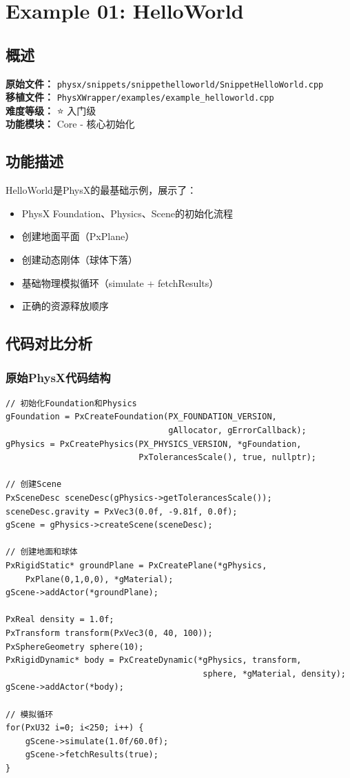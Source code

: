 \section{Example 01: HelloWorld}
\label{sec:example_helloworld}

\subsection{概述}
\textbf{原始文件：} \texttt{physx/snippets/snippethelloworld/SnippetHelloWorld.cpp} \\
\textbf{移植文件：} \texttt{PhysXWrapper/examples/example\_helloworld.cpp} \\
\textbf{难度等级：} ⭐ 入门级 \\
\textbf{功能模块：} Core - 核心初始化

\subsection{功能描述}
HelloWorld是PhysX的最基础示例，展示了：
\begin{itemize}
    \item PhysX Foundation、Physics、Scene的初始化流程
    \item 创建地面平面（PxPlane）
    \item 创建动态刚体（球体下落）
    \item 基础物理模拟循环（simulate + fetchResults）
    \item 正确的资源释放顺序
\end{itemize}

\subsection{代码对比分析}

\subsubsection{原始PhysX代码结构}
\begin{lstlisting}[caption={原始SnippetHelloWorld核心代码}]
// 初始化Foundation和Physics
gFoundation = PxCreateFoundation(PX_FOUNDATION_VERSION,
                                 gAllocator, gErrorCallback);
gPhysics = PxCreatePhysics(PX_PHYSICS_VERSION, *gFoundation,
                           PxTolerancesScale(), true, nullptr);

// 创建Scene
PxSceneDesc sceneDesc(gPhysics->getTolerancesScale());
sceneDesc.gravity = PxVec3(0.0f, -9.81f, 0.0f);
gScene = gPhysics->createScene(sceneDesc);

// 创建地面和球体
PxRigidStatic* groundPlane = PxCreatePlane(*gPhysics,
    PxPlane(0,1,0,0), *gMaterial);
gScene->addActor(*groundPlane);

PxReal density = 1.0f;
PxTransform transform(PxVec3(0, 40, 100));
PxSphereGeometry sphere(10);
PxRigidDynamic* body = PxCreateDynamic(*gPhysics, transform,
                                        sphere, *gMaterial, density);
gScene->addActor(*body);

// 模拟循环
for(PxU32 i=0; i<250; i++) {
    gScene->simulate(1.0f/60.0f);
    gScene->fetchResults(true);
}
\end{lstlisting}

